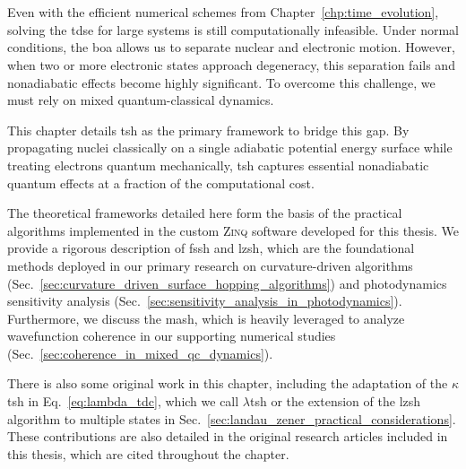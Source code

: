 \chapter{\foldertotitle}\label{chp:mixed_quantum_classical_dynamics}
Even with the efficient numerical schemes from Chapter~\ref{chp:time_evolution}, solving the \acrshort{tdse} for large systems is still computationally infeasible. Under normal conditions, the \acrshort{boa} allows us to separate nuclear and electronic motion. However, when two or more electronic states approach degeneracy, this separation fails and nonadiabatic effects become highly significant. To overcome this challenge, we must rely on mixed quantum-classical dynamics.\supercite{10.1063/1.4757762}

This chapter details \acrfull{tsh} as the primary framework to bridge this gap. By propagating nuclei classically on a single adiabatic potential energy surface while treating electrons quantum mechanically, \acrshort{tsh} captures essential nonadiabatic quantum effects at a fraction of the computational cost.

The theoretical frameworks detailed here form the basis of the practical algorithms implemented in the custom \textsc{Zinq} software developed for this thesis.\supercite{10.5281/zenodo.18386143} We provide a rigorous description of \acrfull{fssh} and \acrfull{lzsh}, which are the foundational methods deployed in our primary research on curvature-driven algorithms (Sec.~\ref{sec:curvature_driven_surface_hopping_algorithms}) and photodynamics sensitivity analysis (Sec.~\ref{sec:sensitivity_analysis_in_photodynamics}). Furthermore, we discuss the \acrfull{mash}, which is heavily leveraged to analyze wavefunction coherence in our supporting numerical studies (Sec.~\ref{sec:coherence_in_mixed_qc_dynamics}).

There is also some original work in this chapter, including the adaptation of the $\kappa$\acrshort{tsh} in Eq.~\eqref{eq:lambda_tdc}, which we call $\lambda$\acrshort{tsh} or the extension of the \acrshort{lzsh} algorithm to multiple states in Sec.~\ref{sec:landau_zener_practical_considerations}. These contributions are also detailed in the original research articles included in this thesis, which are cited throughout the chapter.
